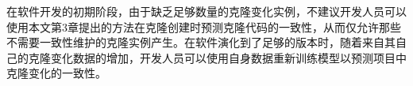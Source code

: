 在软件开发的初期阶段，由于缺乏足够数量的克隆变化实例，不建议开发人员可以使用本文第3章提出的方法在克隆创建时预测克隆代码的一致性，从而仅允许那些不需要一致性维护的克隆实例产生。在软件演化到了足够的版本时，随着来自其自己的克隆变化数据的增加，开发人员可以使用自身数据重新训练模型以预测项目中克隆变化的一致性。

